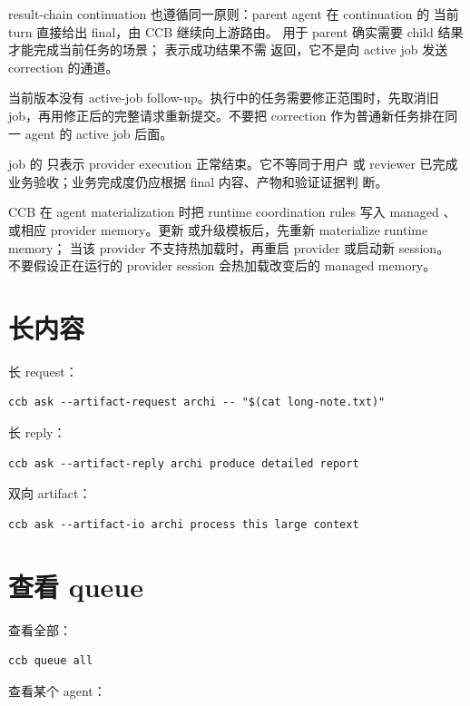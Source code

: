 result-chain continuation 也遵循同一原则：parent agent 在 continuation 的
当前 turn 直接给出 final，由 CCB 继续向上游路由。 用于 parent
确实需要 child 结果才能完成当前任务的场景； 表示成功结果不需
返回，它不是向 active job 发送 correction 的通道。

当前版本没有 active-job follow-up。执行中的任务需要修正范围时，先取消旧
job，再用修正后的完整请求重新提交。不要把 correction 作为普通新任务排在同
一 agent 的 active job 后面。

job 的  只表示 provider execution 正常结束。它不等同于用户
或 reviewer 已完成业务验收；业务完成度仍应根据 final 内容、产物和验证证据判
断。

CCB 在 agent materialization 时把 runtime coordination rules 写入 managed
、 或相应 provider memory。更新
 或升级模板后，先重新 materialize runtime memory；
当该 provider 不支持热加载时，再重启 provider 或启动新 session。
不要假设正在运行的 provider session 会热加载改变后的 managed memory。

\section{长内容}

长 request：

\begin{lstlisting}
ccb ask --artifact-request archi -- "$(cat long-note.txt)"
\end{lstlisting}

长 reply：

\begin{lstlisting}
ccb ask --artifact-reply archi produce detailed report
\end{lstlisting}

双向 artifact：

\begin{lstlisting}
ccb ask --artifact-io archi process this large context
\end{lstlisting}

\section{查看 queue}

查看全部：

\begin{lstlisting}
ccb queue all
\end{lstlisting}

查看某个 agent：

